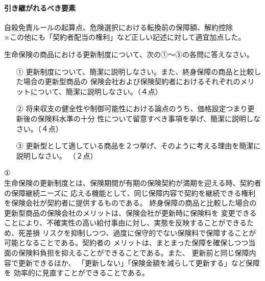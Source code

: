 \documentclass[report,gutter=10mm,fore-edge=10mm,uplatex,dvipdfmx]{jlreq}
\begin{document}
\paragraph{引き継がれるべき要素}
自殺免責ルールの起算点、危険選択における転換前の保障額、解約控除\\
※この他にも「契約者配当の権利」など正しい記述に対して適宜加点した。


生命保険の商品における更新制度について、次の①～③の各問に答えなさい。
\begin{enumerate}
 \item [①] 更新制度について、簡潔に説明しなさい。また、終身保障の商品と比較した場合の更新型商品の
 保険会社および保険契約者におけるそれぞれのメリットについて、簡潔に説明しなさい。（４点）
 \item [②] 将来収支の健全性や制御可能性における論点のうち、価格設定つまり更新後の保険料水準の十分
 性について留意すべき事項を挙げ、簡潔に説明しなさい。（４点）
 \item [③] 更新型として適している商品を２つ挙げ、そのように考える理由を簡潔に説明しなさい。 （２点）
\end{enumerate}

①\\
生命保険の更新制度とは、保険期間が有期の保険契約が満期を迎える時、契約者の保障継続ニーズに
応える機能として、同じ保障内容で契約を継続できる権利を保険会社が契約者に提供するものである。
終身保障の商品と比較した場合の更新型商品の保険会社のメリットは、保険会社が更新時に保険料を
変更できることにより、不確実性の高い給付事由に対し、実態を反映することができるため、死差損
リスクを抑制しつつ、過度に保守的でない保険料で保障することが可能となることである。契約者の
メリットは、まとまった保障を確保しつつ当面の保険料負担を抑えることができることである。また、
更新前と同じ保障内容で更新できるほか、
「更新しない」「保険金額を減らして更新する」など保障を
効率的に見直すことができることである。
\end{document}
